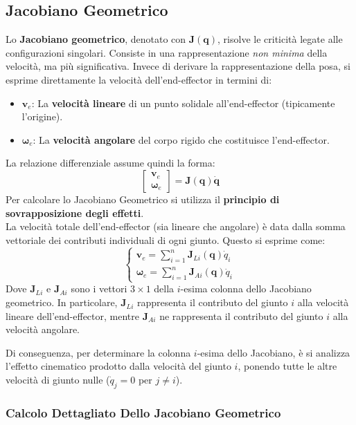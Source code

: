﻿\documentclass[11pt, a4paper]{article}
\begin{document}
\subsection{Jacobiano Geometrico}
Lo \textbf{Jacobiano geometrico}, denotato con \(\bm{J}(\bm{q})\), risolve le criticità legate alle configurazioni singolari. Consiste in una rappresentazione \textit{non minima} della velocità, ma più significativa. Invece di derivare la rappresentazione della posa, si esprime direttamente la velocità dell'end-effector in termini di:
\begin{itemize}
    \item \(\bm{v}_e\): La \textbf{velocità lineare} di un punto solidale all'end-effector (tipicamente l'origine).
    \item \(\bm{\omega}_e\): La \textbf{velocità angolare} del corpo rigido che costituisce l'end-effector.
\end{itemize}
La relazione differenziale assume quindi la forma:
\[
    \begin{bmatrix}
        \bm{v}_e \\
        \bm{\omega}_e
    \end{bmatrix}
    =
    \bm{J}(\bm{q})\dot{\bm{q}}
\]
Per calcolare lo Jacobiano Geometrico si utilizza il \textbf{principio di sovrapposizione degli effetti}.\\
La velocità totale dell'end-effector (sia lineare che angolare) è data dalla somma vettoriale dei contributi individuali di ogni giunto. Questo si esprime come:
\[
    \begin{cases}
        \displaystyle{\bm{v}_e = \sum_{i=1}^n \bm{J}_{Li}(\bm{q})\dot{q}_i} \\
       \displaystyle{ \bm{\omega}_e = \sum_{i=1}^n \bm{J}_{Ai}(\bm{q})\dot{q}_i}
    \end{cases}
\]
Dove \(\bm{J}_{Li}\) e \(\bm{J}_{Ai}\) sono i vettori \(3 \times 1\)  della \(i\)-esima colonna dello Jacobiano geometrico. In particolare, \(\bm{J}_{Li}\) rappresenta il contributo del giunto \(i\) alla velocità lineare dell'end-effector, mentre \(\bm{J}_{Ai}\) ne rappresenta il contributo del giunto \(i\) alla velocità angolare.

Di conseguenza, per determinare la colonna \(i\)-esima dello Jacobiano, è si analizza l'effetto cinematico prodotto dalla velocità del giunto \(i\), ponendo tutte le altre velocità di giunto nulle (\(\dot{q}_j = 0\) per \(j \neq i\)).
\newpage

\subsubsection{Calcolo Dettagliato Dello Jacobiano Geometrico}
\end{document}
